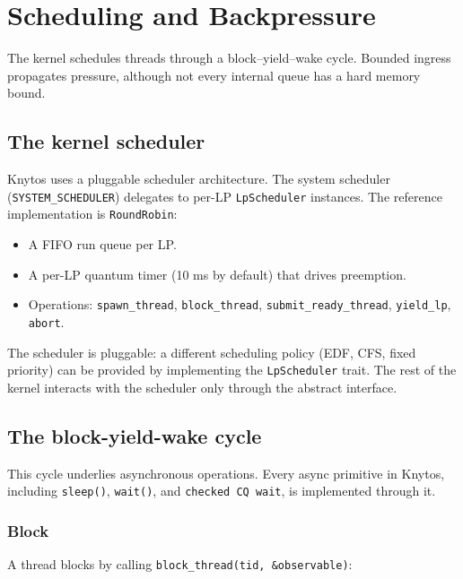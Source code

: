 \chapter{Scheduling and Backpressure}
\label{chap:scheduling}

The kernel schedules threads through a block--yield--wake cycle. Bounded ingress
propagates pressure, although not every internal queue has a hard memory bound.

\section{The kernel scheduler}

Knytos uses a pluggable scheduler architecture. The system scheduler
(\texttt{SYSTEM\_SCHEDULER}) delegates to per-LP \texttt{LpScheduler} instances.
The reference implementation is \texttt{RoundRobin}:

\begin{itemize}
    \item A FIFO run queue per LP.
    \item A per-LP quantum timer (10 ms by default) that drives preemption.
    \item Operations: \texttt{spawn\_thread}, \texttt{block\_thread},
        \texttt{submit\_ready\_thread}, \texttt{yield\_lp}, \texttt{abort}.
\end{itemize}

The scheduler is pluggable: a different scheduling policy (EDF, CFS, fixed
priority) can be provided by implementing the \texttt{LpScheduler} trait. The
rest of the kernel interacts with the scheduler only through the abstract
interface.

\section{The block-yield-wake cycle}

This cycle underlies asynchronous operations. Every async primitive in
Knytos, including \texttt{sleep()}, \texttt{wait()}, and
\texttt{checked CQ wait}, is implemented through it.

\subsection{Block}

A thread blocks by calling \texttt{block\_thread(tid, \&observable)}:

